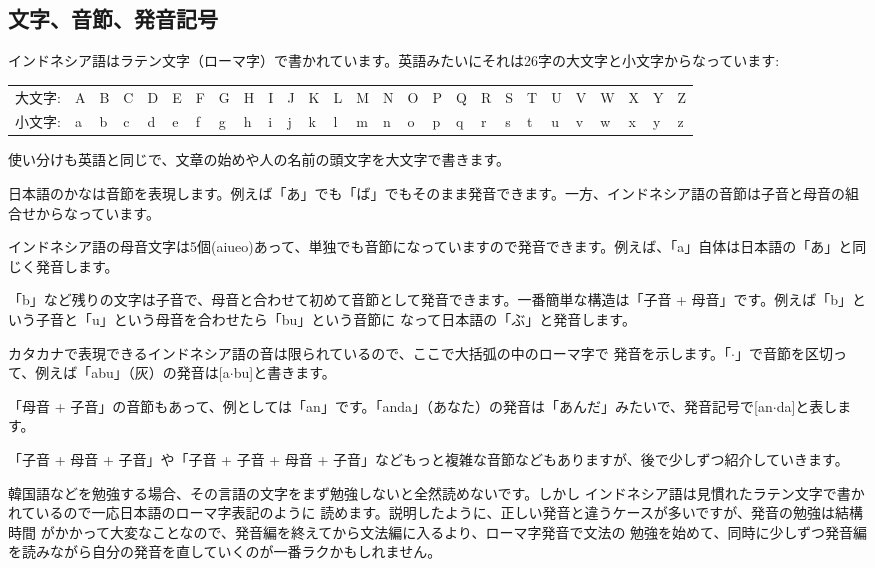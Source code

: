 \documentclass[uplatex]{jsarticle}
\theoremstyle{definition}
\begin{document}
\subsection{文字、音節、発音記号}

インドネシア語はラテン文字（ローマ字）で書かれています。英語みたいにそれは26字の大文字と小文字からなっています:

\begin{tabular}{ll@{\,}l@{\,}l@{\,}l@{\,}l@{\,}l@{\,}l@{\,}l@{\,}l@{\,}l@{\,}l@{\,}l@{\,}l@{\,}l@{\,}l@{\,}l@{\,}l@{\,}l@{\,}l@{\,}l@{\,}l@{\,}l@{\,}l@{\,}l@{\,}l@{\,}l}
大文字: & A & B & C & D & E & F & G & H & I & J & K & L & M & N & O & P & Q & R & S & T & U & V & W & X & Y & Z \\
小文字: & a & b & c & d & e & f & g & h & i & j & k & l & m & n & o & p & q & r & s & t & u & v & w & x & y & z
\end{tabular}

使い分けも英語と同じで、文章の始めや人の名前の頭文字を大文字で書きます。

日本語のかなは音節を表現します。例えば「あ」でも「ば」でもそのまま発音できます。一方、インドネシア語の音節は子音と母音の組合せからなっています。

インドネシア語の母音文字は5個(aiueo)あって、単独でも音節になっていますので発音できます。例えば、「a」自体は日本語の「あ」と同じく発音します。

「b」など残りの文字は子音で、母音と合わせて初めて音節として発音できます。一番簡単な構造は「子音
+
母音」です。例えば「b」という子音と「u」という母音を合わせたら「bu」という音節に
なって日本語の「ぶ」と発音します。

カタカナで表現できるインドネシア語の音は限られているので、ここで大括弧の中のローマ字で
発音を示します。「$\cdot$」で音節を区切って、例えば「abu」（灰）の発音は[a$\cdot$bu]と書きます。

「母音 +
子音」の音節もあって、例としては「an」です。「anda」（あなた）の発音は「あんだ」みたいで、発音記号で[an$\cdot$da]と表します。

「子音 + 母音 + 子音」や「子音 + 子音 + 母音 +
子音」などもっと複雑な音節などもありますが、後で少しずつ紹介していきます。

韓国語などを勉強する場合、その言語の文字をまず勉強しないと全然読めないです。しかし
インドネシア語は見慣れたラテン文字で書かれているので一応日本語のローマ字表記のように
読めます。説明したように、正しい発音と違うケースが多いですが、発音の勉強は結構時間
がかかって大変なことなので、発音編を終えてから文法編に入るより、ローマ字発音で文法の
勉強を始めて、同時に少しずつ発音編を読みながら自分の発音を直していくのが一番ラクかもしれません。
\end{document}
